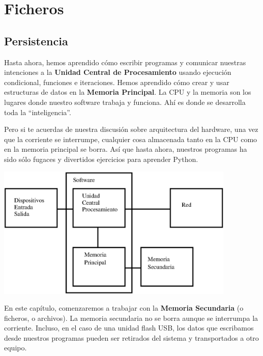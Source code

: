 
\chapter{Ficheros}



\section{Persistencia}


Hasta ahora, hemos aprendido cómo escribir programas y comunicar
nuestras intenciones a la {\bf Unidad Central de Procesamiento} usando ejecución
condicional, funciones e iteraciones. Hemos aprendido cómo
crear y usar estructuras de datos en la {\bf Memoria Principal}. La CPU
y la memoria son los lugares donde nuestro software trabaja y funciona. Ahí es
donde se desarrolla toda la ``inteligencia''.

Pero si te acuerdas de nuestra discusión sobre arquitectura del hardware,
una vez que la corriente se interrumpe, cualquier cosa almacenada tanto
en la CPU como en la memoria principal se borra. Así que hasta ahora, nuestros
programas ha sido sólo fugaces y divertidos ejercicios para aprender Python.

\beforefig
\centerline{\includegraphics[height=2.50in]{figs2/arch3.eps}}
\afterfig

En este capítulo, comenzaremos a trabajar con la {\bf Memoria Secundaria}
(o ficheros, o archivos).
La memoria secundaria no se borra aunque se interrumpa la corriente.
Incluso, en el caso de una unidad flash USB, los
datos que escribamos desde nuestros programas pueden ser retirados
del sistema y transportados a otro equipo.

